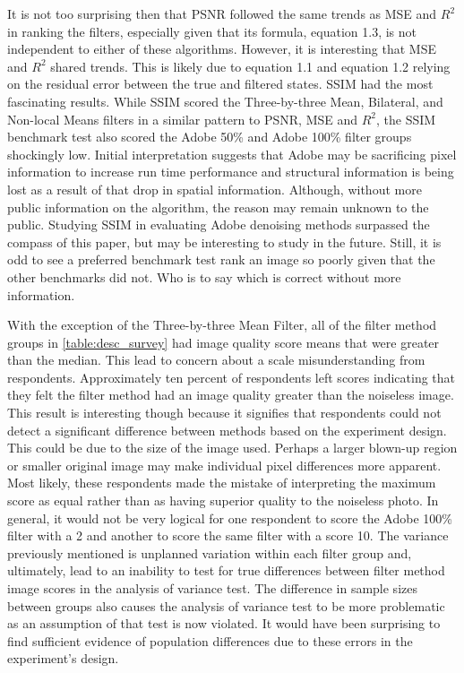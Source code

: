 \documentclass{ncjms}
\begin{document}
It is not too surprising then that PSNR followed the same trends as MSE and $R^2$ in ranking the filters, especially given that its formula, equation 1.3, is not independent to either of these algorithms. However, it is interesting that MSE and $R^2$ shared trends. This is likely due to equation 1.1 and equation 1.2 relying on the residual error between the true and filtered states. SSIM had the most fascinating results. While SSIM scored the Three-by-three Mean, Bilateral, and Non-local Means filters in a similar pattern to PSNR, MSE and $R^2$, the SSIM benchmark test also scored the Adobe 50\% and Adobe 100\% filter groups shockingly low. Initial interpretation suggests that Adobe may be sacrificing pixel information to increase run time performance and structural information is being lost as a result of that drop in spatial information. Although, without more public information on the algorithm, the reason may remain unknown to the public. Studying SSIM in evaluating Adobe denoising methods surpassed the compass of this paper, but may be interesting to study in the future. Still, it is odd to see a preferred benchmark test rank an image so poorly given that the other benchmarks did not. Who is to say which is correct without more information.

With the exception of the Three-by-three Mean Filter, all of the filter method groups in  \autoref{table:desc_survey} had image quality score means that were greater than the median. This lead to concern about a scale misunderstanding from respondents. Approximately ten percent of respondents left scores indicating that they felt the filter method had an image quality greater than the noiseless image. This result is interesting though because it signifies that respondents could not detect a significant difference between methods based on the experiment design. This could be due to the size of the image used. Perhaps a larger blown-up region or smaller original image may make individual pixel differences more apparent. Most likely, these respondents made the mistake of interpreting the maximum score as equal rather than as having superior quality to the noiseless photo. In general, it would not be very logical for one respondent to score the Adobe 100\% filter with a 2 and another to score the same filter with a score 10. The variance previously mentioned is unplanned variation within each filter group and, ultimately, lead to an inability to test for true differences between filter method image scores in the analysis of variance test. The difference in sample sizes between groups also causes the analysis of variance test to be more problematic as an assumption of that test is now violated. It would have been surprising to find sufficient evidence of population differences due to these errors in the experiment's design.
\end{document}
